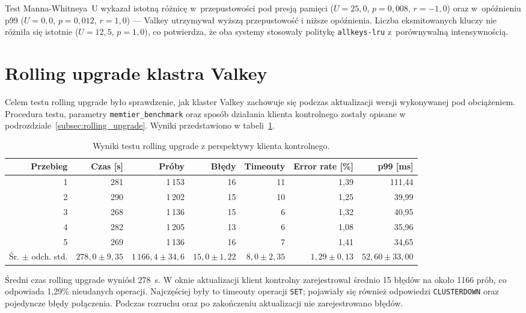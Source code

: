 Test Manna-Whitneya~U wykazał istotną różnicę w~przepustowości pod presją pamięci ($U = 25{,}0$, $p = 0{,}008$, $r = -1{,}0$) oraz w~opóźnieniu p99 ($U = 0{,}0$, $p = 0{,}012$, $r = 1{,}0$) --- Valkey utrzymywał wyższą przepustowość i niższe opóźnienia. Liczba eksmitowanych kluczy nie różniła się istotnie ($U = 12{,}5$, $p = 1{,}0$), co potwierdza, że oba systemy stosowały politykę \texttt{allkeys-lru} z~porównywalną intensywnością.

\section{Rolling upgrade klastra Valkey}

Celem testu rolling upgrade było sprawdzenie, jak klaster Valkey zachowuje się podczas aktualizacji wersji wykonywanej pod obciążeniem. Procedura testu, parametry \texttt{memtier\_benchmark} oraz sposób działania klienta kontrolnego zostały opisane w podrozdziale~\ref{subsec:rolling_upgrade}. Wyniki przedstawiono w tabeli~\ref{tab:upgrade-results}.

\begin{table}[htbp]
\centering
\caption{Wyniki testu rolling upgrade z perspektywy klienta kontrolnego.}
\label{tab:upgrade-results}
\begin{adjustbox}{max width=\textwidth}
\begin{tabular}{rrrrrrr}
\toprule
Przebieg & Czas [s] & Próby & Błędy & Timeouty & Error rate [\%] & p99 [ms] \\
\midrule
1 & 281 & 1\,153 & 16 & 11 & 1{,}39 & 111{,}44 \\
2 & 290 & 1\,202 & 15 & 10 & 1{,}25 & 39{,}99 \\
3 & 268 & 1\,136 & 15 & 6 & 1{,}32 & 40{,}95 \\
4 & 282 & 1\,205 & 13 & 6 & 1{,}08 & 35{,}96 \\
5 & 269 & 1\,136 & 16 & 7 & 1{,}41 & 34{,}65 \\
\midrule
Śr. $\pm$ odch. std. & $278{,}0 \pm 9{,}35$ & $1\,166{,}4 \pm 34{,}6$ & $15{,}0 \pm 1{,}22$ & $8{,}0 \pm 2{,}35$ & $1{,}29 \pm 0{,}13$ & $52{,}60 \pm 33{,}00$ \\
\bottomrule
\end{tabular}
\end{adjustbox}
\end{table}

\FloatBarrier

Średni czas rolling upgrade wyniósł 278~s. W oknie aktualizacji klient kontrolny zarejestrował średnio 15 błędów na około 1166 prób, co odpowiada 1{,}29\% nieudanych operacji. Najczęściej były to timeouty operacji \texttt{SET}; pojawiały się również odpowiedzi \texttt{CLUSTERDOWN} oraz pojedyncze błędy połączenia. Podczas rozruchu oraz po zakończeniu aktualizacji nie zarejestrowano błędów.

